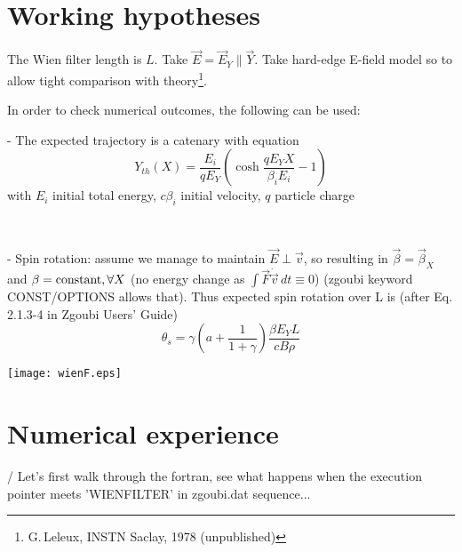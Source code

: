 \section*{Working hypotheses}

\nib The Wien filter length is $ L$. Take $ \vec E =\vec E_Y \parallel \vec Y$.
Take  hard-edge E-field model  so to allow tight comparison with theory\footnote{G.\,Leleux, INSTN Saclay, 1978 (unpublished)}.

\nib In order to check numerical outcomes, the following can be used:

\begin{minipage}{.69\linewidth}
\nin - The expected trajectory is a catenary with equation
%  
$$ Y_{th}(X) = \frac{E_i}{qE_Y} \left( \cosh \dfrac{qE_Y X}{\beta_i E_i } -1 \right)$$
with $E_i$  initial total energy, $c\beta_i$ initial velocity, $q$  particle charge

~

\nin -  Spin rotation: assume we manage to maintain $\vec E \perp \vec v$, so resulting in $\vec \beta = \vec \beta_X$ and
$\beta = {\rm constant} , \forall X$ (no energy change as $\int \vec F \dot \vec v \, dt \equiv 0$)
(zgoubi keyword CONST/OPTIONS allows that).
Thus expected spin rotation over L  is (after Eq.\,2.1.3-4 in Zgoubi Users' Guide)
$$ \theta_s = \gamma (a+\dfrac{1}{1+\gamma})\dfrac{\beta E_YL}{cB\rho}  $$

\end{minipage} \hfill
\begin{minipage}{.3\linewidth}
  \texttt{[image: wienF.eps]}
\end{minipage}


\section*{ Numerical experience }


/ Let's  first walk through the fortran, see what happens when the execution pointer meets 'WIENFILTER'  in zgoubi.dat sequence...

